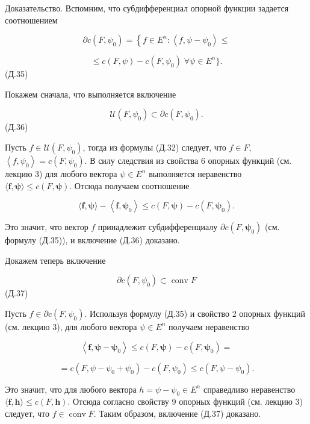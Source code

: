 \documentclass[8pt]{extarticle}
\begin{document}
Доказательство. Вспомним, что субдифференциал опорной функции задается соотношением

\[
\partial c\left( {F,{\psi }_{0}}\right)  = \left\{  {f \in  {E}^{n} : \left\langle  {f,\psi  - {\psi }_{0}}\right\rangle   \leq  }\right.
\]

\[
\leq  c\left( {F,\psi }\right)  - c\left( {F,{\psi }_{0}}\right) \;\forall \psi  \in  {E}^{n}\} .
\]
 (Д.35)

Покажем сначала, что выполняется включение

\[
\mathcal{U}\left( {F,{\psi }_{0}}\right)  \subset  \partial c\left( {F,{\psi }_{0}}\right) .
\]
 (Д.36)

Пусть \(f \in  \mathcal{U}\left( {F,{\psi }_{0}}\right)\), тогда из формулы (Д.32) следует, что \(f \in  F\), \(\left\langle  {f,{\psi }_{0}}\right\rangle   = c\left( {F,{\psi }_{0}}\right)\). В силу следствия из свойства 6 опорных функций (см. лекцию 3) для любого вектора \(\psi  \in  {E}^{n}\) выполняется неравенство \(\langle \mathbf{f},\mathbf{\psi }\rangle  \leq  c\left( {F,\mathbf{\psi }}\right)\). Отсюда получаем соотношение

\[
\langle \mathbf{f},\mathbf{\psi }\rangle  - \left\langle  {\mathbf{f},{\mathbf{\psi }}_{0}}\right\rangle   \leq  c\left( {F,\mathbf{\psi }}\right)  - c\left( {F,{\mathbf{\psi }}_{0}}\right) .
\]

Это значит, что вектор \(f\) принадлежит субдифференциалу \(\partial c\left( {F,{\mathbf{\psi }}_{0}}\right)\) (см. формулу (Д.35)), и включение (Д.36) доказано.

Докажем теперь включение

\[
\partial c\left( {F,{\psi }_{0}}\right)  \subset  \operatorname{conv}F
\]
 (Д.37)

Пусть \(f \in  \partial c\left( {F,{\psi }_{0}}\right)\). Используя формулу (Д.35) и свойство 2 опорных функций (см. лекцию 3), для любого вектора \(\psi  \in  {E}^{n}\) получаем неравенство

\[
\left\langle  {\mathbf{f},\mathbf{\psi } - {\mathbf{\psi }}_{0}}\right\rangle   \leq  c\left( {F,\mathbf{\psi }}\right)  - c\left( {F,{\mathbf{\psi }}_{0}}\right)  =
\]

\[
= c\left( {F,\psi  - {\psi }_{0} + {\psi }_{0}}\right)  - c\left( {F,{\psi }_{0}}\right)  \leq  c\left( {F,\psi  - {\psi }_{0}}\right) .
\]

Это значит, что для любого вектора \(h = \psi  - {\psi }_{0} \in  {E}^{n}\) справедливо неравенство \(\langle \mathbf{f},\mathbf{h}\rangle  \leq  c\left( {F,\mathbf{h}}\right)\). Отсюда согласно свойству 9 опорных функций (см. лекцию 3) следует, что \(f \in  \operatorname{conv}F\). Таким образом, включение (Д.37) доказано.
\end{document}
